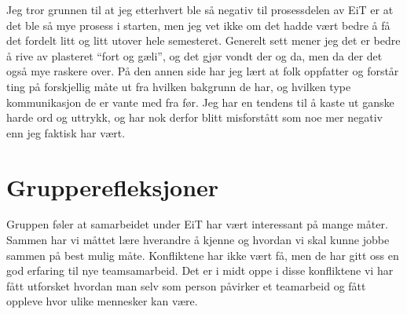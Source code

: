 Jeg tror grunnen til at jeg etterhvert ble så negativ til prosessdelen av EiT 
er at det ble så mye prosess i starten, men jeg vet ikke om det hadde vært bedre å få 
det fordelt litt og litt utover hele semesteret. Generelt sett mener jeg det er 
bedre å rive av plasteret ``fort og gæli'', og det gjør vondt der og da, men 
da der det også mye raskere over. 
På den annen side har jeg lært at folk oppfatter og forstår ting på forskjellig måte ut fra 
hvilken bakgrunn de har, og hvilken type kommunikasjon de er vante med fra før.
Jeg har en tendens til å kaste ut ganske harde ord og uttrykk, og har nok 
derfor blitt misforstått som noe mer negativ enn jeg faktisk har vært. 

\section{Grupperefleksjoner}

Gruppen føler at samarbeidet under EiT har vært interessant på mange måter. Sammen har vi måttet lære
hverandre å kjenne og hvordan vi skal kunne jobbe sammen på best mulig måte. Konfliktene har ikke vært få,
men de har gitt oss en god erfaring til nye teamsamarbeid. Det er i midt oppe i disse konfliktene vi har fått
utforsket hvordan man selv som person påvirker et teamarbeid og fått oppleve hvor ulike mennesker kan være. 


